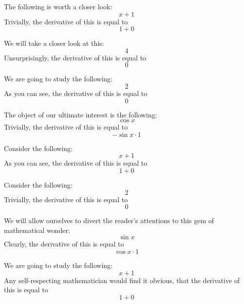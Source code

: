 \documentclass{article}
\begin{document}
The following is worth a closer look:
\begin{equation}
x + 1 
\end{equation}
Trivially, the derivative of this is equal to
\begin{equation}
1 + 0 
\end{equation}

We will take a closer look at this:
\begin{equation}
4 
\end{equation}
Unsurprisingly, the derivative of this is equal to
\begin{equation}
0 
\end{equation}

We are going to study the following:
\begin{equation}
2 
\end{equation}
As you can see, the derivative of this is equal to
\begin{equation}
0 
\end{equation}

The object of our ultimate interest is the following:
\begin{equation}
\cos x 
\end{equation}
Trivially, the derivative of this is equal to
\begin{equation}
-\sin x \cdot 1 
\end{equation}

Consider the following:
\begin{equation}
x + 1 
\end{equation}
As you can see, the derivative of this is equal to
\begin{equation}
1 + 0 
\end{equation}

Consider the following:
\begin{equation}
2 
\end{equation}
Trivially, the derivative of this is equal to
\begin{equation}
0 
\end{equation}

We will allow ourselves to divert the reader's attentions to this gem of mathematical wonder:
\begin{equation}
\sin x 
\end{equation}
Clearly, the derivative of this is equal to
\begin{equation}
\cos x \cdot 1 
\end{equation}

We are going to study the following:
\begin{equation}
x + 1 
\end{equation}
Any self-respecting mathematician would find it obvious, that the derivative of this is equal to
\begin{equation}
1 + 0 
\end{equation}
\end{document}
